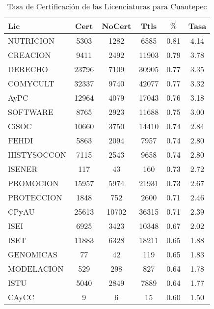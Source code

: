 \documentclass{article}
\begin{document}
\begin{table}[h]
\centering
\begin{tabular}{|l|cc|c|cc|}\hline\hline
Lic & Cert & NoCert & Ttls & $\%$ & Tasa \\\hline\hline
NUTRICION & 5303 & 1282 & 6585 & 0.81 & 4.14 \\\hline\hline
CREACION & 9411 & 2492 & 11903 & 0.79 & 3.78 \\
DERECHO & 23796 & 7109 & 30905 & 0.77 & 3.35 \\
COMYCULT & 32337 & 9740 & 42077 & 0.77 & 3.32 \\
AyPC & 12964 & 4079 & 17043 & 0.76 & 3.18 \\
SOFTWARE & 8765 & 2923 & 11688 & 0.75 & 3.00 \\\hline\hline
CiSOC & 10660 & 3750 & 14410 & 0.74 & 2.84 \\
FEHDI & 5863 & 2094 & 7957 & 0.74 & 2.80 \\
HISTYSOCCON & 7115 & 2543 & 9658 & 0.74 & 2.80 \\
ISENER & 117 & 43 & 160 & 0.73 & 2.72 \\
PROMOCION & 15957 & 5974 & 21931 & 0.73 & 2.67 \\\hline\hline
PROTECCION & 1848 & 752 & 2600 & 0.71 & 2.46 \\
CPyAU & 25613 & 10702 & 36315 & 0.71 & 2.39 \\
ISEI & 6925 & 3423 & 10348 & 0.67 & 2.02 \\\hline\hline
ISET & 11883 & 6328 & 18211 & 0.65 & 1.88 \\
GENOMICAS & 77 & 42 & 119 & 0.65 & 1.83 \\
MODELACION & 529 & 298 & 827 & 0.64 & 1.78 \\
ISTU & 5040 & 2849 & 7889 & 0.64 & 1.77 \\
CAyCC & 9 & 6 & 15 & 0.60 & 1.50 \\\hline\hline
\end{tabular}
\caption{Tasa de Certificación de las Licenciaturas para Cuautepec}
\end{table}
\end{document}
